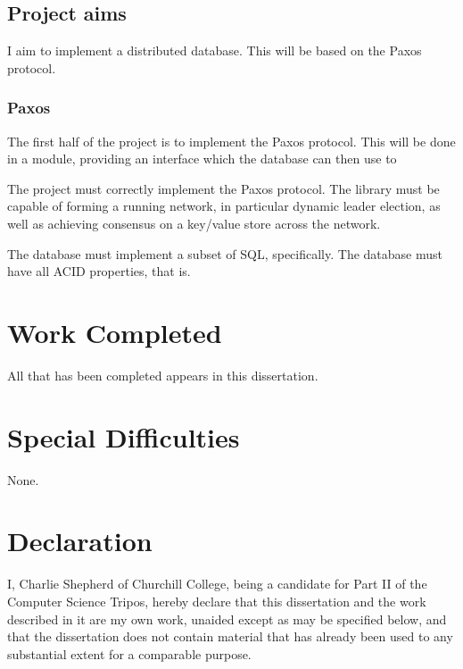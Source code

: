 \documentclass[12pt,twoside,notitlepage]{report}
\begin{document}
\subsection*{Project aims}

I aim to implement a distributed database. This will be based on the Paxos protocol.

\subsubsection*{Paxos}

The first half of the project is to implement the Paxos protocol. This will be done in a module,
providing an interface which the database can then use to

The project must correctly implement the Paxos protocol.  The library must be capable of forming a
running network, in particular dynamic leader election, as well as achieving consensus on a
key/value store across the network.

The database must implement a subset of SQL, specifically. The database must have all ACID
properties, that is.

\section*{Work Completed}

All that has been completed appears in this dissertation.

\section*{Special Difficulties}

None.

\newpage
\section*{Declaration}

I, Charlie Shepherd of Churchill College, being a candidate for Part II of the Computer Science
Tripos, hereby declare that this dissertation and the work described in it are my own work,
unaided except as may be specified below, and that the dissertation does not contain material that
has already been used to any substantial extent for a comparable purpose.

\bigskip
{}

\medskip
{}

\cleardoublepage
\end{document}
